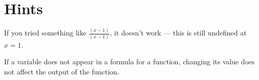 \newpage

\section{Hints}
\begin{hint}
  If you tried something like $\frac{(x-1)}{(x-1)}$, it doesn't work --- this is still undefined at $x=1$.
\end{hint}

\begin{hint}
  If a variable does not appear in a formula for a function, changing its value does not affect the output of the function.
\end{hint}
